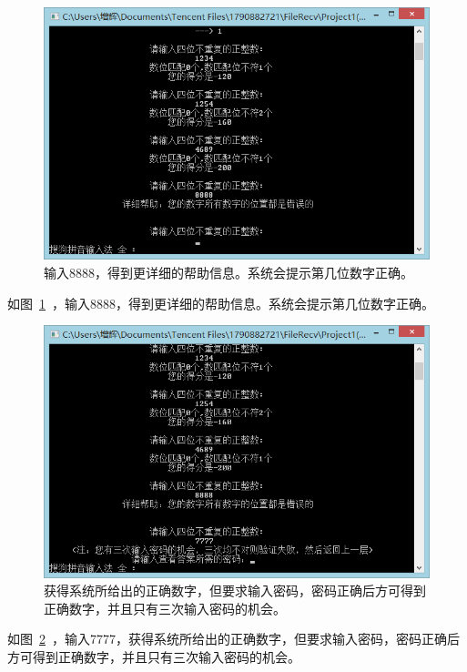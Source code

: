 \begin{figure}[htp]
\includegraphics[width=\textwidth]{image/25.png}
\caption{\label{p5}输入8888，得到更详细的帮助信息。系统会提示第几位数字正确。}
\end{figure}
 
如图~\ref{p5}~，输入8888，得到更详细的帮助信息。系统会提示第几位数字正确。
 
\begin{figure}[htp]
\includegraphics[width=\textwidth]{image/26.png}
\caption{\label{p6}获得系统所给出的正确数字，但要求输入密码，密码正确后方可得到正确数字，并且只有三次输入密码的机会。}
\end{figure}
 
如图~\ref{p6}~，输入7777，获得系统所给出的正确数字，但要求输入密码，密码正确后方可得到正确数字，并且只有三次输入密码的机会。

